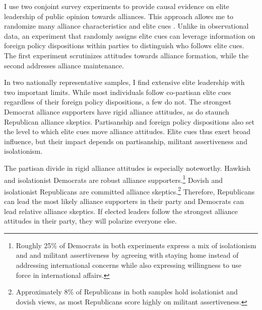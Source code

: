 \documentclass[12pt]{article}
\begin{document}
I use two conjoint survey experiments to provide causal evidence on elite leadership of public opinion towards alliances.
This approach allows me to randomize many alliance characteristics and elite cues \citep{Hainmuelleretal2014}.
Unlike in observational data, an experiment that randomly assigns elite cues can leverage information on foreign policy dispositions within parties to distinguish who follows elite cues. 
The first experiment scrutinizes attitudes towards alliance formation, while the second addresses alliance maintenance. 


In two nationally representative samples, I find extensive elite leadership with two important limits.
While most individuals follow co-partisan elite cues regardless of their foreign policy dispositions, a few do not.
The strongest Democrat alliance supporters have rigid alliance attitudes, as do staunch Republican alliance skeptics. 
Partisanship and foreign policy dispositions also set the level to which elite cues move alliance attitudes.
Elite cues thus exert broad influence, but their impact depends on partisanship, militant assertiveness and isolationism.


The partisan divide in rigid alliance attitudes is especially noteworthy.
Hawkish and isolationist Democrats are robust alliance supporters.\footnote{Roughly 25\% of Democrats in both experiments express a mix of isolationism and and militant assertiveness by agreeing with staying home instead of addressing international concerns while also expressing willingness to use force in international affairs.}
Dovish and isolationist Republicans are committed alliance skeptics.\footnote{Approximately 8\% of Republicans in both samples hold isolationist and dovish views, as most Republicans score highly on militant assertiveness.} 
Therefore, Republicans can lead the most likely alliance supporters in their party and Democrats can lead relative alliance skeptics. 
If elected leaders follow the strongest alliance attitudes in their party, they will polarize everyone else. 


\end{document}
